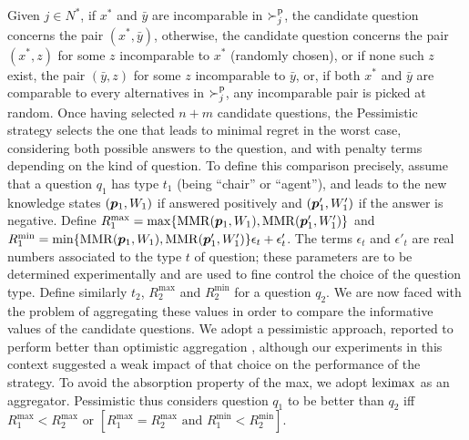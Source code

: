 \documentclass{article}
\begin{document}
\begin{details*}[Pessimistic]
	Given $j \in N^*$, if $x^*$ and $\bar{y}$ are incomparable in $\succ^\text{p}_j$, the candidate question concerns the pair $(x^*, \bar{y})$, otherwise, the candidate question concerns the pair $(x^*, z)$ for some $z$ incomparable to $x^*$ (randomly chosen), or if none such $z$ exist, the pair $(\bar{y}, z)$ for some $z$ incomparable to $\bar{y}$, or, if both $x^*$ and $\bar{y}$ are comparable to every alternatives in $\succ^\text{p}_j$, any incomparable pair is picked at random. 
	Once having selected $n + m$ candidate questions, the Pessimistic strategy selects the one that leads to minimal regret in the worst case, considering both possible answers to the question, and with penalty terms depending on the kind of question. To define this comparison precisely, assume that a question $q_1$ has type $t_1$ (being “chair” or “agent”), and leads to the new knowledge states $({\bm{p}}_1, W_1)$ if answered positively and $({\bm{p}}'_1, W'_1)$ if the answer is negative. 
	Define $R^{\max}_1 = \max\{\operatorname{MMR}({\bm{p}}_1, W_1), \operatorname{MMR}({\bm{p}}'_1, W'_1)\}$
	and $R^{\min}_1 = \min\{\operatorname{MMR}({\bm{p}}_1, W_1), \operatorname{MMR}({\bm{p}}'_1, W'_1)\} \epsilon_{t} + \epsilon'_{t}$.
	The terms $\epsilon_t$ and $\epsilon'_{t}$ are real numbers associated to the type $t$ of question; these parameters are to be determined experimentally and are used to fine control the choice of the question type.
	Define similarly $t_2$, $R^{\max}_2$ and $R^{\min}_2$ for a question $q_2$.
	We are now faced with the problem of aggregating these values in order to compare the informative values of the candidate questions. We adopt a pessimistic approach, reported to perform better than optimistic aggregation \citep{Cailloux2014}, although our experiments in this context suggested a weak impact of that choice on the performance of the strategy.
	To avoid the absorption property of the max, we adopt $\operatorname{leximax}$ as an aggregator.
	Pessimistic thus considers question $q_1$ to be better  than $q_2$ iff $R^{\max}_1 < R^{\max}_2 \text{ or } [R^{\max}_1 = R^{\max}_2 \text{ and } R^{\min}_1 < R^{\min}_2]$.

\end{details*}
\end{document}
